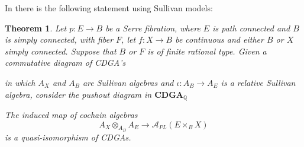 \documentclass{scrartcl}
\theoremstyle{plain}
\newtheorem{theorem}{Theorem}[section]
\theoremstyle{definition}
\newcommand{\Q}{\mathbb Q}
\newcommand{\Apl}{\mathcal A_{PL}}
\begin{document}
In \cite[15.8]{hess2007rational} there is the following statement using Sullivan models:
\begin{theorem}\label{thm:pullback-pushout-sullivan}
    Let $p\colon E\to B$ be a Serre fibration, where $E$ is path connected and $B$ is simply connected, with fiber $F$, let $f\colon X\to B$ be continuous and either $B$ or $X$ simply connected. Suppose that $B$ or $F$ is of finite rational type. Given a commutative diagram of CDGA's
    \begin{center}
    \end{center}
    in which $A_X$ and $A_B$ are Sullivan algebras and $\iota\colon A_B\to A_E$ is a relative Sullivan algebra, consider the pushout diagram in $\mathbf{CDGA}_\Q$
    \begin{center}
    \end{center}
    The induced map of cochain algebras 
    $$A_X\otimes_{A_B} A_E \to \Apl(E\times_B X)$$
    is a quasi-isomorphism of CDGAs.
\end{theorem}


    
\end{document}
